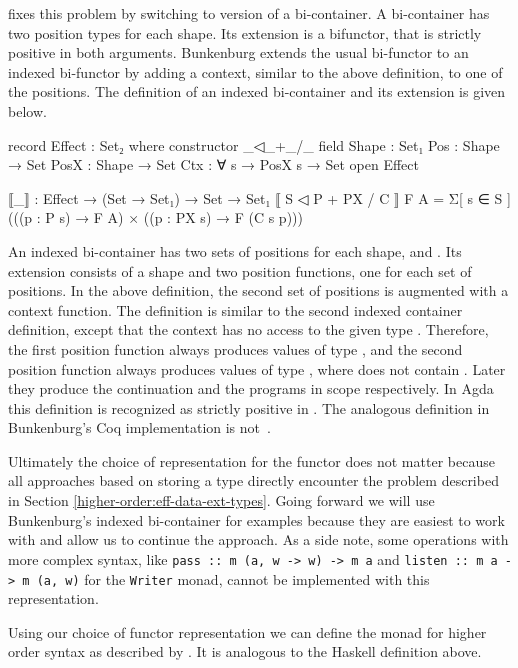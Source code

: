 \textcite{bunkenburg2019modeling} fixes this problem by switching to version of
a bi-container.
A bi-container has two position types for each shape.
Its extension is a bifunctor, that is strictly positive in both arguments.
Bunkenburg extends the usual bi-functor to an indexed bi-functor by adding a
context, similar to the above definition, to one of the positions.
The definition of an indexed bi-container and its extension is given below.

\begin{code}
record Effect : Set₂ where
  constructor _◁_+_/_
  field
    Shape : Set₁
    Pos : Shape → Set
    PosX : Shape → Set
    Ctx : ∀ s → PosX s → Set
open Effect

⟦_⟧ : Effect → (Set → Set₁) → Set → Set₁
⟦ S ◁ P + PX / C ⟧ F A = Σ[ s ∈ S ] (((p : P s) → F A) × ((p : PX s) → F (C s p)))
\end{code}
An indexed bi-container has two sets of positions for each shape, 
and .
Its extension consists of a shape and two position functions, one for each set
of positions.
In the above definition, the second set of positions is augmented with a context
function.
The definition is similar to the second indexed container definition, except
that the context has no access to the given type .
Therefore, the first position function always produces values of type
, and the second position function always produces values of
type , where  does not contain
.
Later they produce the continuation and the programs in scope respectively.
In Agda this definition is recognized as strictly positive in .
The analogous definition in Bunkenburg's Coq implementation is
not~\cite{bunkenburg2019modeling}.
 
Ultimately the choice of representation for the functor does not matter because
all approaches based on storing a type directly encounter the problem described
in Section \ref{higher-order:eff-data-ext-types}.
Going forward we will use Bunkenburg's indexed bi-container for examples because
they are easiest to work with and allow us to continue the approach.
As a side note, some operations with more complex syntax, like
\texttt{pass :: m (a, w -> w) -> m a} and
\texttt{listen :: m a -> m (a, w)} for the 
\texttt{Writer} monad, cannot be implemented with this
representation.
 
Using our choice of functor representation we can define the 
monad for higher order syntax as described by
\textcite{DBLP:conf/haskell/WuSH14}.
It is analogous to the Haskell definition above.

